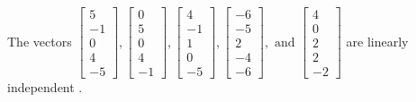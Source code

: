 \begin{exercise}
\begin{exerciseStatement}
  \end{exerciseStatement}
  \begin{exerciseAnswer}
   The vectors \(\left[\begin{array}{r}
5 \\
-1 \\
0 \\
4 \\
-5
\end{array}\right] , \left[\begin{array}{r}
0 \\
5 \\
0 \\
4 \\
-1
\end{array}\right] , \left[\begin{array}{r}
4 \\
-1 \\
1 \\
0 \\
-5
\end{array}\right] , \left[\begin{array}{r}
-6 \\
-5 \\
2 \\
-4 \\
-6
\end{array}\right] , \text{ and } \left[\begin{array}{r}
4 \\
0 \\
2 \\
2 \\
-2
\end{array}\right]\) are 
  	 linearly independent  .
  


  \end{exerciseAnswer}
\end{exercise}